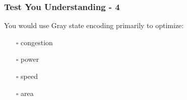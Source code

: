 \documentclass[t, notes, xcolor=table]{beamer}
\begin{document}
\begin{frame}
\frametitle{Test You Understanding - 4}
You would use Gray state encoding primarily to optimize:
\begin{itemize}
\item[$\square$] congestion
\item[$\square$] power
\item[$\square$] speed
\item[$\square$] area
\end{itemize}
\end{frame}
\end{document}
